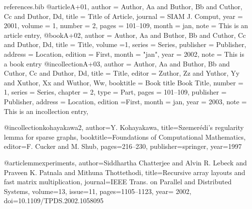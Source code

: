 \RequirePackage{filecontents}
\begin{filecontents}{references.bib}
@article{A+01,
  author = {Author, Aa and Buthor, Bb and Cuthor, Cc and Duthor, Dd},
  title = {Title of Article},
  journal = {SIAM J. Comput},
  year = {2001},
  volume = {1},
  number = {2},
  pages = {101--109},
  month = jan,
  note = {This is an article entry},
}
@book{A+02,
  author = {Author, Aa and Buthor, Bb and Cuthor, Cc and Duthor, Dd},
  title = {Title},
  volume ={1},
  series = {Series},
  publisher = {Publisher},
  address = {Location},
  edition = {First},
  month = "jan",
  year = {2002},
  note = {This is a book entry}
}
@incollection{A+03,
  author = {Author, Aa and Buthor, Bb and Cuthor, Cc and Duthor, Dd},
  title = {Title},
  editor = {Zuthor, Zz and Yuthor, Yy and Xuthor, Xx and Wuthor, Ww},
  booktitle = {Book title Book Title},
  number = {1},
  series = {Series},
  chapter = {2},
  type = {Part},
  pages = {101--109},
  publisher = {Publisher},
  address = {Location},
  edition ={First},
  month = jan,
  year = {2003},
  note = {This is an incollection entry},
}

@incollection{kohayakawa2,
author={Y. Kohayakawa},
title={{Szemer\'{e}di's} regularity lemma for sparse graphs},
booktitle={Foundations of Computational Mathematics},
editor={F. Cucker and M. Shub},
pages={216--230},
publisher=springer,
year={1997}
}

@article{mmexperiments,
author={Siddhartha Chatterjee and  Alvin R. Lebeck and  Praveen K. Patnala and Mithuna Thottethodi},
title={Recursive array layouts and fast matrix multiplication},
journal={IEEE Trans. on Parallel and Distributed Systems},
volume={13},
issue={11},
pages={1105--1123},
year= {2002},
doi={10.1109/TPDS.2002.1058095}
}

\end{filecontents}



\documentclass{article}
\providecommand\noopsort[1]{}
\usepackage{xpatch}
\usepackage[%
 backend   =  biber   , 
 style     = trad-alpha,
]{biblatex}



\nocite{*}
\printbibliography

